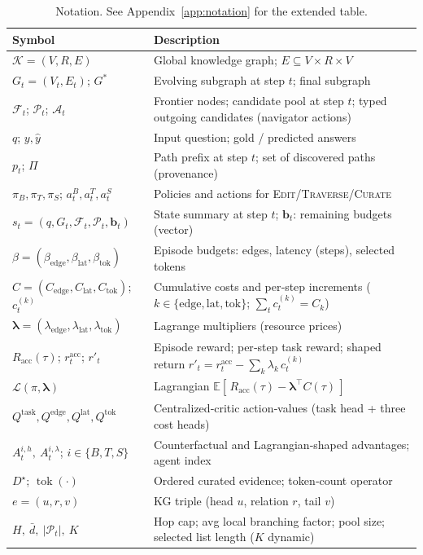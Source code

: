 \documentclass{article} %
\begin{document}
\begin{table}[t!]
\centering
\setlength{\abovecaptionskip}{2pt}
\setlength{\belowcaptionskip}{0pt}
\renewcommand{\arraystretch}{0.95}
\setlength{\tabcolsep}{4.5pt}
\footnotesize
\caption{Notation. See Appendix~\ref{app:notation} for the extended table.}
\label{tab:notation-1}
\begin{tabularx}{\linewidth}{@{}lL@{}}
\toprule
\textbf{Symbol} & \textbf{Description} \\
\midrule
$\mathcal{K}=(V,R,E)$ & Global knowledge graph; $E\subseteq V\times R\times V$ \\
$G_t=(V_t,E_t)$; $G^\ast$ & Evolving subgraph at step $t$; final subgraph \\
$\mathcal{F}_t$; $\mathcal{P}_t$; $\mathcal{A}_t$ & Frontier nodes; candidate pool at step $t$; typed outgoing candidates (navigator actions) \\
$q$; $y,\hat y$ & Input question; gold / predicted answers \\
$p_t$; $\Pi$ & Path prefix at step $t$; set of discovered paths (provenance) \\
$\pi_B,\pi_T,\pi_S$; $a_t^B,a_t^T,a_t^S$ & Policies and actions for \textsc{Edit}/\textsc{Traverse}/\textsc{Curate} \\
$s_t=(q,G_t,\mathcal{F}_t,\mathcal{P}_t,\mathbf{b}_t)$ & State summary at step $t$; $\mathbf{b}_t$: remaining budgets (vector) \\
$\beta=(\beta_{\text{edge}},\beta_{\text{lat}},\beta_{\text{tok}})$ & Episode budgets: edges, latency (steps), selected tokens \\
$C=(C_{\text{edge}},C_{\text{lat}},C_{\text{tok}})$; $c_t^{(k)}$ & Cumulative costs and per‑step increments ($k\!\in\!\{\text{edge},\text{lat},\text{tok}\}$; $\sum_t c_t^{(k)}=C_k$) \\
$\boldsymbol{\lambda}=(\lambda_{\text{edge}},\lambda_{\text{lat}},\lambda_{\text{tok}})$ & Lagrange multipliers (resource prices) \\
$R_{\mathrm{acc}}(\tau)$; $r^{\mathrm{acc}}_t$; $r'_t$ & Episode reward; per‑step task reward; shaped return $r'_t=r^{\mathrm{acc}}_t-\sum_{k}\lambda_k\,c_t^{(k)}$ \\
$\mathcal{L}(\pi,\boldsymbol{\lambda})$ & Lagrangian $\mathbb{E}[\,R_{\mathrm{acc}}(\tau)-\boldsymbol{\lambda}^{\top}C(\tau)\,]$ \\
$Q^{\text{task}},Q^{\text{edge}},Q^{\text{lat}},Q^{\text{tok}}$ & Centralized‑critic action‑values (task head + three cost heads) \\
$A^{i,h}_t,\ A^{i,\lambda}_t$; $i\in\{B,T,S\}$ & Counterfactual and Lagrangian‑shaped advantages; agent index \\
$D^\star$; $\operatorname{tok}(\cdot)$ & Ordered curated evidence; token‑count operator \\
$e=(u,r,v)$ & KG triple (head $u$, relation $r$, tail $v$) \\
$H,\ \bar d,\ |\mathcal{P}_t|,\ K$ & Hop cap; avg local branching factor; pool size; selected list length ($K$ dynamic) \\
\bottomrule
\end{tabularx}
\end{table}
\end{document}
